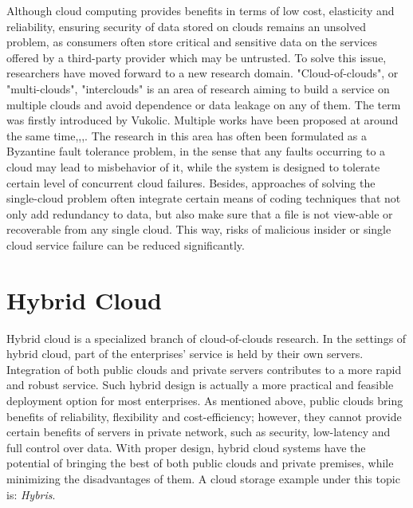 Although cloud computing provides benefits in terms of low cost, elasticity and reliability, ensuring security of data stored on clouds remains an unsolved problem, as consumers often store critical and sensitive data on the services offered by a third-party provider which may be untrusted. To solve this issue, researchers have moved forward to  a new research domain\cite{aizain2012multiclouds}. "Cloud-of-clouds", or "multi-clouds", "interclouds" is an area of research aiming to build a service on multiple clouds and avoid dependence or data leakage on any of them. The term was firstly introduced by Vukolic\cite{vukolic2010byzantine}. Multiple works have been proposed at around the same time\cite{bowers2009hail},\cite{abu2010racs},\cite{cachin2010dependable},\cite{bessani2013depsky}. The research in this area has often been formulated as a Byzantine fault tolerance problem\cite{lamport1982byzantine}, in the sense that any faults occurring to a cloud may lead to misbehavior of it, while the system is designed to tolerate certain level of concurrent cloud failures. Besides, approaches of solving the single-cloud problem often integrate certain means of coding techniques that not only add redundancy to data, but also make sure that a file is not view-able or recoverable from any single cloud. This way, risks of malicious insider or single cloud service failure can be reduced significantly.

\newpage

\section{Hybrid Cloud}
\label{s:hybridcloud}

Hybrid cloud is a specialized branch of cloud-of-clouds research. In the settings of hybrid cloud, part of the enterprises' service is held by their own servers. Integration of both public clouds and private servers contributes to a more rapid and robust service. Such hybrid design is actually a more practical and feasible deployment option for most enterprises. As mentioned above, public clouds bring benefits of reliability, flexibility and cost-efficiency; however, they cannot provide certain benefits of servers in private network, such as security, low-latency and full control over data. With proper design, hybrid cloud systems have the potential of bringing the best of both public clouds and private premises, while minimizing the disadvantages of them. A cloud storage example under this topic is: \textit{Hybris}\cite{dobre2014hybris}.

